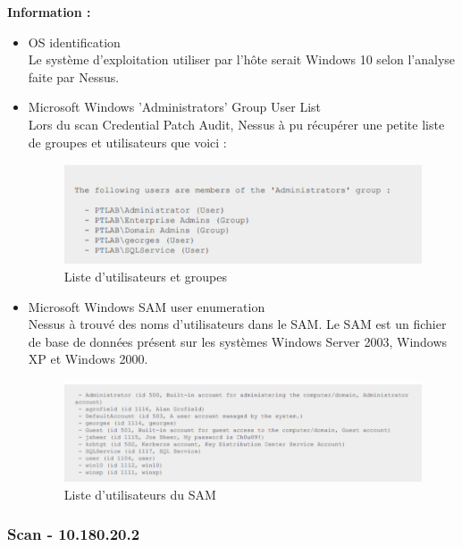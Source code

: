 \documentclass[french,paper=a4,oneside,captions=tableheading]{article}
\begin{document}
\textbf{Information :}
\begin{itemize}
    \item OS identification\\
Le système d'exploitation utiliser par l'hôte serait Windows 10 selon l'analyse faite par Nessus.\\

    \item Microsoft Windows 'Administrators' Group User List \\
Lors du scan Credential Patch Audit, Nessus à pu récupérer une petite liste de groupes et utilisateurs que voici : 

\begin{figure}[H]
    \centering
    \includegraphics[width=11cm]{images/users_admingroup.png}
    \caption{Liste d'utilisateurs et groupes}
    \label{fig:userlist}
\end{figure}
    
    \item Microsoft Windows SAM user enumeration \\
Nessus à trouvé des noms d'utilisateurs dans le SAM. Le SAM est un fichier de base de données présent sur les systèmes Windows Server 2003, Windows XP et Windows 2000.

\begin{figure}[H]
    \centering
    \includegraphics[width=11cm]{images/userSAM.png}
    \caption{Liste d'utilisateurs du SAM}
    \label{fig:userlistSAM}
\end{figure}

\end{itemize}



\subsubsection{Scan - 10.180.20.2}
\end{document}
